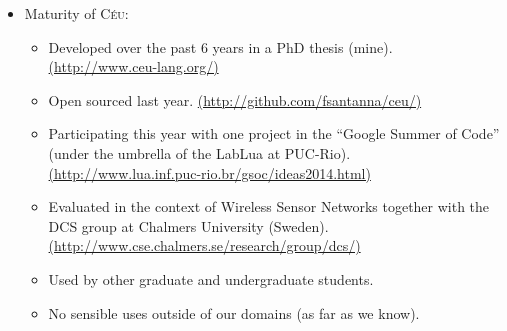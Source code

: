 \documentclass[11pt,a4paper]{article}
\newcommand{\CEU}{\textsc{C\'{e}u}\xspace}
\begin{document}
\begin{itemize}
    \item Maturity of \CEU:
        \begin{itemize}
        \item Developed over the past 6 years in a PhD thesis (mine).
                  \url{(http://www.ceu-lang.org/)}
        \item Open sourced last year.
                  \url{(http://github.com/fsantanna/ceu/)}
        \item Participating this year with one project in the ``Google Summer 
              of Code'' (under the umbrella of the LabLua at PUC-Rio).
                  \url{(http://www.lua.inf.puc-rio.br/gsoc/ideas2014.html)}
        \item Evaluated in the context of Wireless Sensor Networks together 
          with the DCS group at Chalmers University (Sweden).
                  \url{(http://www.cse.chalmers.se/research/group/dcs/)}
        \item Used by other graduate and undergraduate students.
        \item No sensible uses outside of our domains (as far as we know).
        \end{itemize}
\end{itemize}
\end{document}
